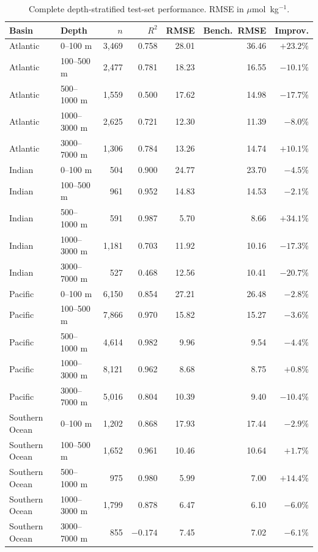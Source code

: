 \documentclass[12pt,a4paper]{article}
\begin{document}
\begin{table}[htbp]
\centering
\caption{Complete depth-stratified test-set performance. RMSE in $\mu$mol~kg$^{-1}$.}
\small
\begin{tabular}{ll r rrr r}
\toprule
\textbf{Basin} & \textbf{Depth} & $n$ & $R^2$ & RMSE & Bench.\ RMSE & \textbf{Improv.} \\
\midrule
Atlantic & 0--100 m      & 3{,}469  & 0.758 & 28.01 & 36.46 & $+23.2\%$ \\
Atlantic & 100--500 m    & 2{,}477  & 0.781 & 18.23 & 16.55 & $-10.1\%$ \\
Atlantic & 500--1000 m   & 1{,}559  & 0.500 & 17.62 & 14.98 & $-17.7\%$ \\
Atlantic & 1000--3000 m  & 2{,}625  & 0.721 & 12.30 & 11.39 & $-8.0\%$ \\
Atlantic & 3000--7000 m  & 1{,}306  & 0.784 & 13.26 & 14.74 & $+10.1\%$ \\
\midrule
Indian & 0--100 m       & 504    & 0.900 & 24.77 & 23.70 & $-4.5\%$ \\
Indian & 100--500 m     & 961    & 0.952 & 14.83 & 14.53 & $-2.1\%$ \\
Indian & 500--1000 m    & 591    & 0.987 & 5.70  & 8.66  & $+34.1\%$ \\
Indian & 1000--3000 m   & 1{,}181 & 0.703 & 11.92 & 10.16 & $-17.3\%$ \\
Indian & 3000--7000 m   & 527    & 0.468 & 12.56 & 10.41 & $-20.7\%$ \\
\midrule
Pacific & 0--100 m      & 6{,}150 & 0.854 & 27.21 & 26.48 & $-2.8\%$ \\
Pacific & 100--500 m    & 7{,}866 & 0.970 & 15.82 & 15.27 & $-3.6\%$ \\
Pacific & 500--1000 m   & 4{,}614 & 0.982 & 9.96  & 9.54  & $-4.4\%$ \\
Pacific & 1000--3000 m  & 8{,}121 & 0.962 & 8.68  & 8.75  & $+0.8\%$ \\
Pacific & 3000--7000 m  & 5{,}016 & 0.804 & 10.39 & 9.40  & $-10.4\%$ \\
\midrule
Southern Ocean & 0--100 m      & 1{,}202 & 0.868 & 17.93 & 17.44 & $-2.9\%$ \\
Southern Ocean & 100--500 m    & 1{,}652 & 0.961 & 10.46 & 10.64 & $+1.7\%$ \\
Southern Ocean & 500--1000 m   & 975    & 0.980 & 5.99  & 7.00  & $+14.4\%$ \\
Southern Ocean & 1000--3000 m  & 1{,}799 & 0.878 & 6.47  & 6.10  & $-6.0\%$ \\
Southern Ocean & 3000--7000 m  & 855    & $-0.174$ & 7.45 & 7.02 & $-6.1\%$ \\
\bottomrule
\end{tabular}
\end{table}
\end{document}

